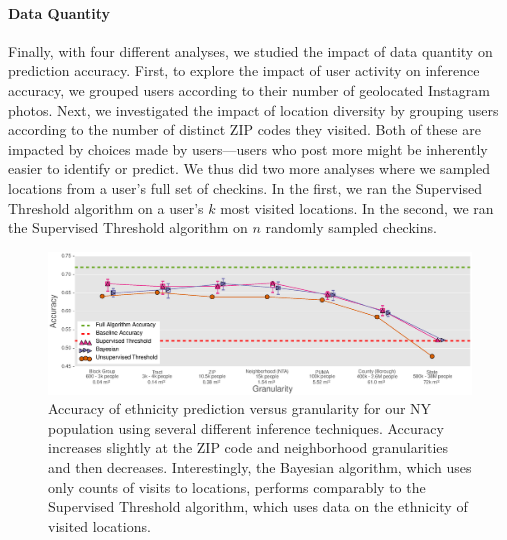 \paragraph{Data Quantity}
Finally, with four different analyses, we studied the impact of data quantity on prediction accuracy.
First, to explore the impact of user activity on inference accuracy, we grouped users according to their number of geolocated Instagram photos.
Next, we investigated the impact of location diversity by grouping users according to the number of distinct ZIP codes they visited.
Both of these are impacted by choices made by users---users who post more might be inherently easier to identify or predict.
We thus did two more analyses where we sampled locations from a user's full set of checkins.
In the first, we ran the Supervised Threshold algorithm on a user's $k$ most visited locations.
In the second, we ran the Supervised Threshold algorithm on $n$ randomly sampled checkins.


\begin{figure}[t]
  \centering
  \includegraphics[width=\textwidth]{fig/footprints/last_big_plot.eps}
    \caption{Accuracy of ethnicity prediction versus granularity for our NY population using several different inference techniques. Accuracy increases slightly at the ZIP code and neighborhood granularities and then decreases. Interestingly, the Bayesian algorithm, which uses only counts of visits to locations, performs comparably to the Supervised Threshold algorithm, which uses data on the ethnicity of visited locations.}
    \label{fig:big_plot}
\end{figure}

